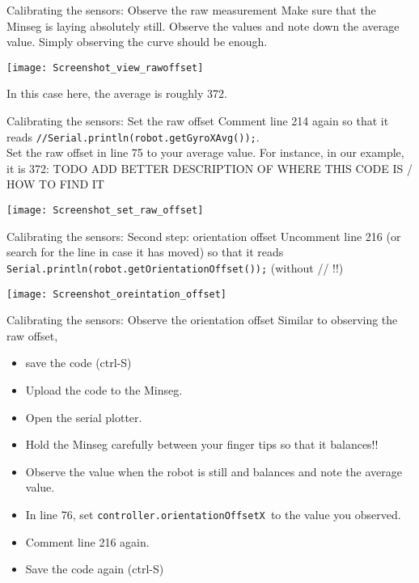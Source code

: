 \begin{frame}{Calibrating the sensors: Observe the raw measurement}
	Make sure that the Minseg is laying absolutely still. Observe the values and note down the average value. Simply observing the curve should be enough.
	\begin{center}
		\texttt{[image: Screenshot\_view\_rawoffset]}
	\end{center}
	In this case here, the average is roughly 372.
\end{frame}

\begin{frame}{Calibrating the sensors: Set the raw offset}
	Comment line 214 again so that it reads \texttt{//Serial.println(robot.getGyroXAvg());}.\\
	Set the raw offset in line 75 to your average value. For instance, in our example, it is 372:
	TODO ADD BETTER DESCRIPTION OF WHERE THIS CODE IS / HOW TO FIND IT
	\begin{center}
		\texttt{[image: Screenshot\_set\_raw\_offset]}
	\end{center}
\end{frame}

\begin{frame}{Calibrating the sensors: Second step: orientation offset}
	Uncomment line 216 (or search for the line in case it has moved) so that it reads \texttt{Serial.println(robot.getOrientationOffset());} (without // !!)
	\begin{center}
		\texttt{[image: Screenshot\_oreintation\_offset]}
	\end{center}
\end{frame}

\begin{frame}{Calibrating the sensors: Observe the orientation offset}
	Similar to observing the raw offset,
	\begin{itemize}
		\item save the code (ctrl-S)
		\item Upload the code to the Minseg.
		\item Open the serial plotter.
		\item Hold the Minseg carefully between your finger tips so that it balances!!
		\item Observe the value when the robot is still and balances and note the average value.
		\item In line 76, set \texttt{controller.orientationOffsetX }to the value you observed.
		\item Comment line 216 again.
		\item Save the code again (ctrl-S)
		\end{itemize}
\end{frame}


